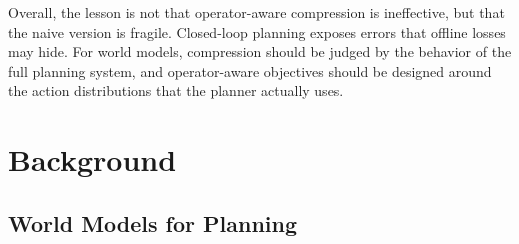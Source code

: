 \documentclass[11pt]{article}
\begin{document}
Overall, the lesson is not that operator-aware compression is ineffective, but that the naive version is fragile. Closed-loop planning exposes errors that offline losses may hide. For world models, compression should be judged by the behavior of the full planning system, and operator-aware objectives should be designed around the action distributions that the planner actually uses.






\section{Background}

\subsection{World Models for Planning}
\end{document}
